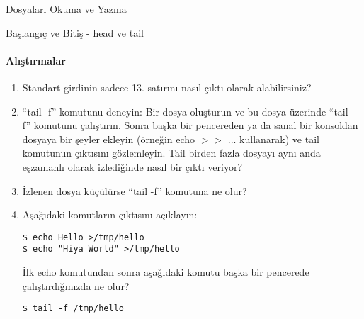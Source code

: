 \begin{section}{Dosyaları Okuma ve Yazma}
\begin{subsection}{Başlangıç ve Bitiş - head ve tail}
\paragraph{{\Huge{\PencilLeftDown}}Alıştırmalar}{
\begin{enumerate}
 \item Standart girdinin sadece 13. satırını nasıl çıktı olarak alabilirsiniz?
 \item “tail -f” komutunu deneyin: Bir dosya oluşturun ve bu dosya üzerinde “tail -f” komutunu çalıştırın. Sonra başka bir pencereden ya da sanal bir konsoldan dosyaya bir şeyler ekleyin (örneğin echo $>>$ ... kullanarak) ve tail komutunun çıktısını gözlemleyin. Tail birden fazla dosyayı aynı anda eşzamanlı olarak izlediğinde nasıl bir çıktı veriyor?
\item İzlenen dosya küçülürse “tail -f” komutuna ne olur?
\item Aşağıdaki komutların çıktısını açıklayın:
\begin{verbatim}
$ echo Hello >/tmp/hello 
$ echo "Hiya World" >/tmp/hello
\end{verbatim}
İlk echo komutundan sonra aşağıdaki komutu başka bir pencerede ça\-lış\-tır\-dı\-ğı\-nız\-da ne olur?
\begin{verbatim}
$ tail -f /tmp/hello
\end{verbatim}
\end{enumerate}}

\end{subsection}
\end{section}

